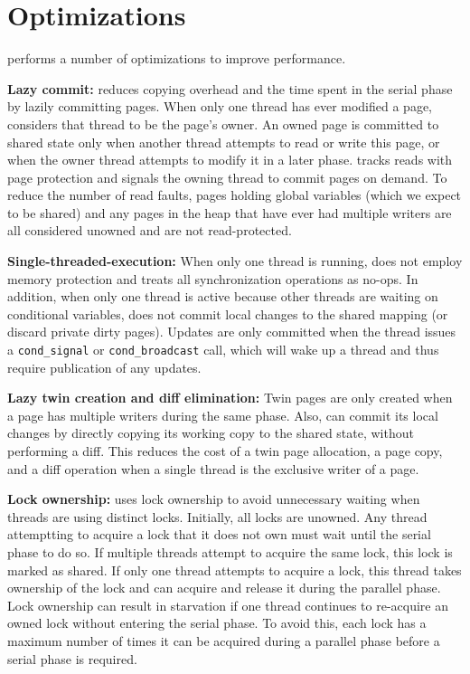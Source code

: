 \section{Optimizations}
\label{sec:dthreads-optimization}

\dthreads{} performs a number of optimizations to improve performance.

\textbf{Lazy commit:} \dthreads{} reduces copying overhead and the time spent in the serial phase by lazily committing pages. When only one thread has ever modified a page, \dthreads{} considers that thread to be the page’s owner. An owned page is committed to shared state only when another thread attempts to read or write this page, or when the owner thread attempts to modify it in a later phase. \dthreads{} tracks reads with page protection and signals the owning thread to commit pages on demand. To reduce the number of read faults, pages holding global variables (which we expect to be shared) and any pages in the heap that have ever had multiple writers are all considered unowned and are not read-protected.

\textbf{Single-threaded-execution: }
When only one thread is running, \dthreads{} does not employ memory protection and treats all synchronization operations as no-ops. In addition, when only one thread is active because other threads are waiting on conditional variables, 
\dthreads{} does not commit local changes to the shared mapping (or discard private dirty pages). Updates are only committed when the thread issues a \texttt{cond\_signal} or \texttt{cond\_broadcast} call, which will wake up a thread and thus require publication of any updates.

\textbf{Lazy twin creation and diff elimination: }
Twin pages are only created when a page has multiple writers during the same phase. Also, \dthreads{} can commit its local changes by directly copying its working copy to the shared state, without performing a diff. This reduces the cost of a twin page allocation, a page copy, and a diff operation when a single thread is the exclusive writer of a page.

\textbf{Lock ownership:} \dthreads{} uses lock ownership to avoid unnecessary waiting when threads are using distinct locks. Initially, all locks are unowned. Any thread attemptting to acquire a lock that it does not own must wait until the serial phase to do so. If multiple threads attempt to acquire the same lock, this lock is marked as shared. If only one thread attempts to acquire a lock, this thread takes ownership of the lock and can acquire and release it during the parallel phase. Lock ownership can result in starvation if one thread continues to re-acquire an owned lock without entering the serial phase. To avoid this, each lock has a maximum number of times it can be acquired during a parallel phase before a serial phase is required.

